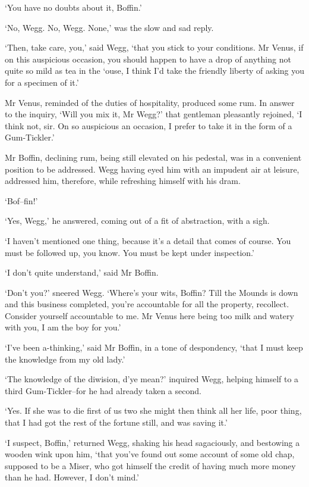 ‘You have no doubts about it, Boffin.’

‘No, Wegg. No, Wegg. None,’ was the slow and sad reply.

‘Then, take care, you,’ said Wegg, ‘that you stick to your conditions.
Mr Venus, if on this auspicious occasion, you should happen to have a
drop of anything not quite so mild as tea in the ‘ouse, I think I’d take
the friendly liberty of asking you for a specimen of it.’

Mr Venus, reminded of the duties of hospitality, produced some rum.
In answer to the inquiry, ‘Will you mix it, Mr Wegg?’ that gentleman
pleasantly rejoined, ‘I think not, sir. On so auspicious an occasion, I
prefer to take it in the form of a Gum-Tickler.’

Mr Boffin, declining rum, being still elevated on his pedestal, was in
a convenient position to be addressed. Wegg having eyed him with an
impudent air at leisure, addressed him, therefore, while refreshing
himself with his dram.

‘Bof--fin!’

‘Yes, Wegg,’ he answered, coming out of a fit of abstraction, with a
sigh.

‘I haven’t mentioned one thing, because it’s a detail that comes of
course. You must be followed up, you know. You must be kept under
inspection.’

‘I don’t quite understand,’ said Mr Boffin.

‘Don’t you?’ sneered Wegg. ‘Where’s your wits, Boffin? Till the Mounds
is down and this business completed, you’re accountable for all the
property, recollect. Consider yourself accountable to me. Mr Venus here
being too milk and watery with you, I am the boy for you.’

‘I’ve been a-thinking,’ said Mr Boffin, in a tone of despondency, ‘that
I must keep the knowledge from my old lady.’

‘The knowledge of the diwision, d’ye mean?’ inquired Wegg, helping
himself to a third Gum-Tickler--for he had already taken a second.

‘Yes. If she was to die first of us two she might then think all her
life, poor thing, that I had got the rest of the fortune still, and was
saving it.’

‘I suspect, Boffin,’ returned Wegg, shaking his head sagaciously, and
bestowing a wooden wink upon him, ‘that you’ve found out some account
of some old chap, supposed to be a Miser, who got himself the credit of
having much more money than he had. However, I don’t mind.’

